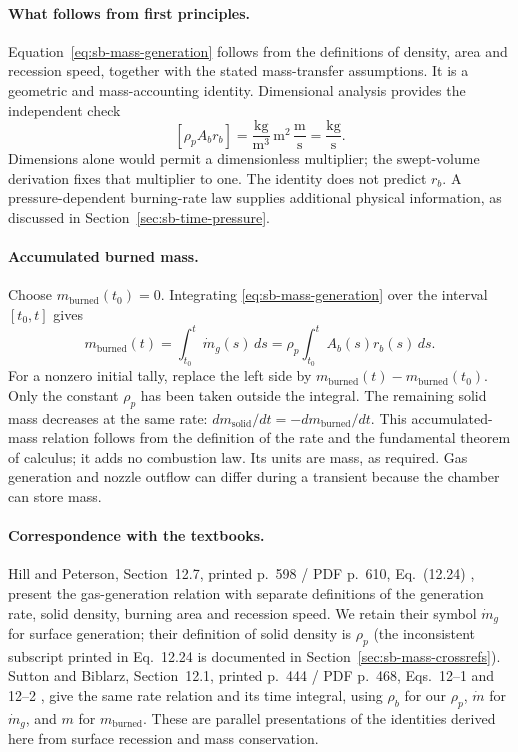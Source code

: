 \paragraph{What follows from first principles.}
Equation~\eqref{eq:sb-mass-generation} follows from the definitions of
density, area and recession speed, together with the stated mass-transfer
assumptions. It is a geometric and mass-accounting identity.
Dimensional analysis provides the independent check
\[
 [\rho_p A_b r_b]
 =\frac{\mathrm{kg}}{\mathrm m^3}\,\mathrm m^2\,
   \frac{\mathrm m}{\mathrm s}
 =\frac{\mathrm{kg}}{\mathrm s}.
\]
Dimensions alone would permit a dimensionless multiplier; the
swept-volume derivation fixes that multiplier to one. The identity
does not predict $r_b$. A pressure-dependent burning-rate law supplies
additional physical information, as discussed in
Section~\ref{sec:sb-time-pressure}.

\paragraph{Accumulated burned mass.}
Choose $m_{\mathrm{burned}}(t_0)=0$. Integrating
\eqref{eq:sb-mass-generation} over the interval $[t_0,t]$ gives
\begin{equation}\label{eq:sb-burned-mass-integral}
 m_{\mathrm{burned}}(t)
 =\int_{t_0}^{t}\dot m_g(s)\,ds
 =\rho_p\int_{t_0}^{t}A_b(s)r_b(s)\,ds.
\end{equation}
For a nonzero initial tally, replace the left side by
$m_{\mathrm{burned}}(t)-m_{\mathrm{burned}}(t_0)$.
Only the constant $\rho_p$ has been taken outside the integral.
The remaining solid mass decreases at the same rate:
$dm_{\mathrm{solid}}/dt=-dm_{\mathrm{burned}}/dt$.
This accumulated-mass relation follows from the definition of the rate
and the fundamental theorem of calculus; it adds no combustion law.
Its units are mass, as required. Gas generation and nozzle outflow
can differ during a transient because the chamber can store mass.

\paragraph{Correspondence with the textbooks.}
Hill and Peterson, Section~12.7, printed p.~598 / PDF p.~610,
Eq.~(12.24) \cite{hillpeterson}, present the gas-generation relation with
separate definitions of the generation rate, solid density, burning area
and recession speed. We retain their symbol $\dot m_g$ for surface generation;
their definition of solid density is $\rho_p$ (the inconsistent subscript
printed in Eq.~12.24 is documented in
Section~\ref{sec:sb-mass-crossrefs}).
Sutton and Biblarz, Section~12.1, printed p.~444 / PDF p.~468,
Eqs.~12--1 and 12--2 \cite{sutton}, give the same rate relation and its
time integral, using $\rho_b$ for our $\rho_p$, $\dot m$ for
$\dot m_g$, and $m$ for $m_{\mathrm{burned}}$.
These are parallel presentations of the identities derived here from
surface recession and mass conservation.


